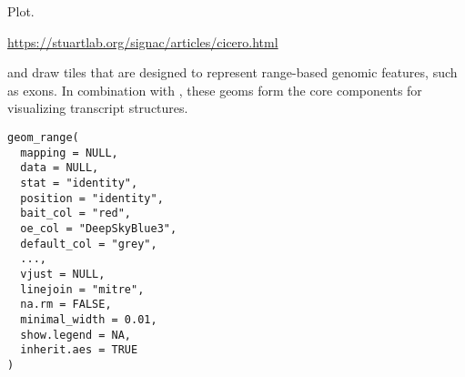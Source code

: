 \documentclass[letterpaper]{book}
\begin{document}
%
\begin{Value}
Plot.
\end{Value}
%
\begin{References}
\url{https://stuartlab.org/signac/articles/cicero.html}
\end{References}
%
\begin{Description}
 and  draw tiles that are designed to
represent range-based genomic features, such as exons. In combination with
, these geoms form the core components for visualizing
transcript structures.
\end{Description}
%
\begin{Usage}
\begin{verbatim}
geom_range(
  mapping = NULL,
  data = NULL,
  stat = "identity",
  position = "identity",
  bait_col = "red",
  oe_col = "DeepSkyBlue3",
  default_col = "grey",
  ...,
  vjust = NULL,
  linejoin = "mitre",
  na.rm = FALSE,
  minimal_width = 0.01,
  show.legend = NA,
  inherit.aes = TRUE
)
\end{verbatim}
\end{Usage}
%
\end{document}
